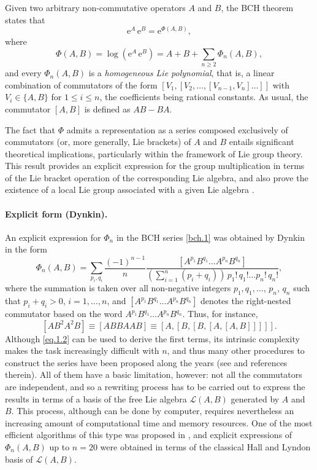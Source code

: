 \documentclass[11pt]{article}
\newcommand{\e}{\ensuremath{\mathrm{e}}}
\begin{document}
Given two arbitrary non-commutative operators $A$ and $B$, the BCH theorem states that 
\begin{equation} \label{bch.0}
   \e^A \, \e^{B} = \e^{\Phi(A,B)},
\end{equation}   
where
\begin{equation} \label{bch.1}
  \Phi(A,B) = \log( \e^A \, \e^B) =   A + B + \sum_{n\ge 2} \Phi_n(A,B),
\end{equation}
and every
 $\Phi_n(A,B)$ is a \emph{homogeneous Lie polynomial}, that is, 
a linear combination
of commutators of the form $[V_1,[V_2, \ldots,[V_{n-1},V_n]
\ldots]]$ with $V_i \in \{A,B\}$ for $1 \le i \le n$, the
coefficients being rational constants. As
usual, the commutator $[A,B]$ is defined as $AB - BA$. 

The fact that $\Phi$ admits a representation as a series composed exclusively of commutators (or, more generally, Lie brackets) of $A$ and $B$ entails significant theoretical implications, particularly within the framework of Lie group theory. This result provides an explicit expression for the group multiplication in terms of the Lie bracket operation of the corresponding Lie algebra, and also prove the existence of a local Lie group associated with a given Lie algebra
\cite{gorbatsevich97fol}.

\paragraph{Explicit form (Dynkin).} An explicit expression for $\Phi_n$ in the BCH series \eqref{bch.1} was obtained
 by Dynkin \cite{dynkin47eot,dynkin00spo} in the form
\begin{equation}  \label{eq.1.2}
  \Phi_n(A,B) =  \sum_{p_i, q_i}
    \frac{(-1)^{n-1}}{n} \frac{[A^{p_1} B^{q_1} \ldots
      A^{p_n} B^{q_n} ]}{(\sum_{i=1}^n (p_i + q_i)) \,
      p_1! \, q_1! \ldots p_n! \, q_n!},
\end{equation} 
where the summation is taken over all non-negative
integers $p_1, q_1, \ldots$, $p_n$, $q_n$ such that
$p_i+q_i>0$, $i=1,\ldots,n$, and 
$[ A^{p_1} B^{q_1} \ldots A^{p_n} B^{q_n}]$ denotes the right-nested commutator based on the word
$ A^{p_1} B^{q_1} \ldots A^{p_n} B^{q_n}$. Thus, for instance,
\[
   [AB^2A^2 B] \equiv [A B B A A B] \equiv [A,[B,[B,[A,[A,B]]]]].
\]
Although \eqref{eq.1.2} can be used to derive the first terms, its intrinsic complexity makes the task increasingly difficult with $n$, and thus many other
procedures to construct the series have been proposed along the years (see \cite{bonfiglioli12tin,casas09aea} and references therein). 
All of them have a basic limitation, however: not all the commutators are independent, and so a rewriting process has to be carried out to express the results in terms of a basis of the free Lie algebra $\mathcal{L}(A,B)$
generated by $A$ and $B$. This process, although can be done by computer, requires nevertheless an
increasing amount of computational time and memory resources. One of the most efficient
algorithms of this type was proposed in \cite{casas09aea}, and explicit expressions of $\Phi_{n}(A,B)$ up to $n=20$ were obtained 
in terms of the classical Hall and Lyndon basis of $\mathcal{L}(A,B)$. 
\end{document}
